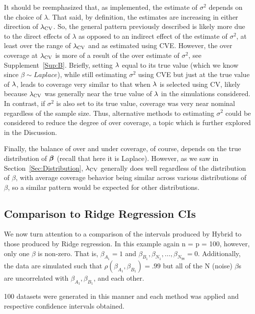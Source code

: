 It should be reemphasized that, as implemented, the estimate of $\sigma^2$ depends on the choice of $\lambda$. That said, by definition, the estimates are increasing in either direction of $\lambda_{\textrm{CV}}$. So, the general pattern previously described is likely more due to the direct effects of $\lambda$ as opposed to an indirect effect of the estimate of $\sigma^2$, at least over the range of $\lambda_{\textrm{CV}}$ and as estimated using CVE. However, the over coverage at $\lambda_{\textrm{CV}}$ is more of a result of the over estimate of $\sigma^2$, see Supplement~\ref{Sup:B}. Briefly, setting $\lambda$ equal to its true value (which we know since $\beta \sim Laplace$), while still estimating $\sigma^2$ using CVE but just at the true value of $\lambda$, leads to coverage very similar to that when $\lambda$ is selected using CV, likely because $\lambda_{\textrm{CV}}$ was generally near the true value of $\lambda$ in the simulations considered. In contrast, if $\sigma^2$ is also set to its true value, coverage was very near nominal regardless of the sample size. Thus, alternative methods to estimating $\sigma^2$ could be considered to reduce the degree of over coverage, a topic which is further explored in the Discussion.

Finally, the balance of over and under coverage, of course, depends on the true distribution of $\boldsymbol{\beta}$ (recall that here it is Laplace). However, as we saw in Section~\ref{Sec:Distribution}, $\lambda_{\textrm{CV}}$ generally does well regardless of the distribution of $\beta$, with average coverage behavior being similar across various distributions of $\beta$, so a similar pattern would be expected for other distributions.

\subsection{Comparison to Ridge Regression CIs}\label{Sec:Ridge}

We now turn attention to a comparison of the intervals produced by Hybrid to those produced by Ridge regression. In this example again n = p = 100, however, only one $\beta$ is non-zero. That is, $\beta_{A_1} = 1$ and $\beta_{B_1}, \beta_{N_1}, \ldots, \beta_{N_{98}} = 0$. Additionally, the data are simulated such that $\rho(\beta_{A_1}, \beta_{B_1}) = .99$ but all of the N (noise) $\beta$s are uncorrelated with $\beta_{A_1}, \beta_{B_1}$, and each other.

100 datasets were generated in this manner and each method was applied and respective confidence intervals obtained.

